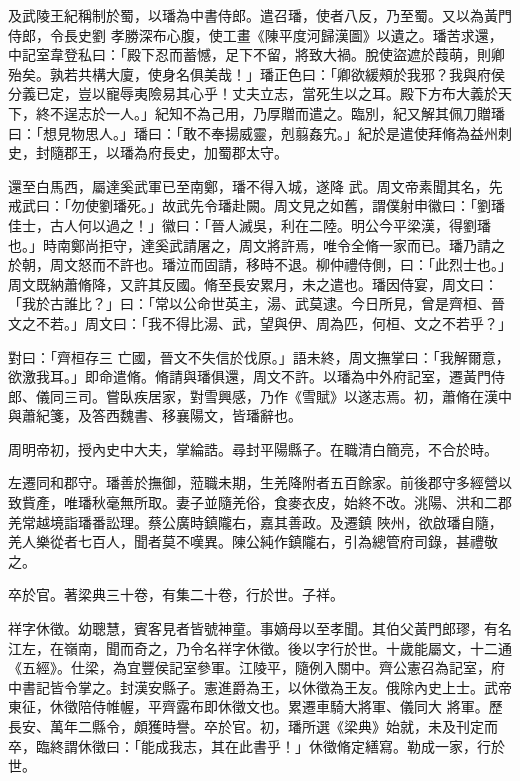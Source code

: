 \begin{pinyinscope}
 及武陵王紀稱制於蜀，以璠為中書侍郎。遣召璠，使者八反，乃至蜀。又以為黃門侍郎，令長史劉
 孝勝深布心腹，使工畫《陳平度河歸漢圖》以遺之。璠苦求還，中記室韋登私曰：「殿下忍而蓄憾，足下不留，將致大禍。脫使盜遮於葭萌，則卿殆矣。孰若共構大廈，使身名俱美哉！」璠正色曰：「卿欲緩頰於我邪？我與府侯分義已定，豈以寵辱夷險易其心乎！丈夫立志，當死生以之耳。殿下方布大義於天下，終不逞志於一人。」紀知不為己用，乃厚贈而遣之。臨別，紀又解其佩刀贈璠曰：「想見物思人。」璠曰：「敢不奉揚威靈，剋翦姦宄。」紀於是遣使拜脩為益州刺史，封隨郡王，以璠為府長史，加蜀郡太守。



 還至白馬西，屬達奚武軍已至南鄭，璠不得入城，遂降
 武。周文帝素聞其名，先戒武曰：「勿使劉璠死。」故武先令璠赴闕。周文見之如舊，謂僕射申徽曰：「劉璠佳士，古人何以過之！」徽曰：「晉人滅吳，利在二陸。明公今平梁漢，得劉璠也。」時南鄭尚拒守，達奚武請屠之，周文將許焉，唯令全脩一家而已。璠乃請之於朝，周文怒而不許也。璠泣而固請，移時不退。柳仲禮侍側，曰：「此烈士也。」周文既納蕭脩降，又許其反國。脩至長安累月，未之遣也。璠因侍宴，周文曰：「我於古誰比？」曰：「常以公命世英主，湯、武莫逮。今日所見，曾是齊桓、晉文之不若。」周文曰：「我不得比湯、武，望與伊、周為匹，何桓、文之不若乎？」



 對曰：「齊桓存三
 亡國，晉文不失信於伐原。」語未終，周文撫掌曰：「我解爾意，欲激我耳。」即命遣脩。脩請與璠俱還，周文不許。以璠為中外府記室，遷黃門侍郎、儀同三司。嘗臥疾居家，對雪興感，乃作《雪賦》以遂志焉。初，蕭脩在漢中與蕭紀箋，及答西魏書、移襄陽文，皆璠辭也。



 周明帝初，授內史中大夫，掌綸誥。尋封平陽縣子。在職清白簡亮，不合於時。



 左遷同和郡守。璠善於撫御，蒞職未期，生羌降附者五百餘家。前後郡守多經營以致貲產，唯璠秋毫無所取。妻子並隨羌俗，食麥衣皮，始終不改。洮陽、洪和二郡羌常越境詣璠番訟理。蔡公廣時鎮隴右，嘉其善政。及遷鎮
 陜州，欲啟璠自隨，羌人樂從者七百人，聞者莫不嘆異。陳公純作鎮隴右，引為總管府司錄，甚禮敬之。



 卒於官。著梁典三十卷，有集二十卷，行於世。子祥。



 祥字休徵。幼聰慧，賓客見者皆號神童。事嫡母以至孝聞。其伯父黃門郎璆，有名江左，在嶺南，聞而奇之，乃令名祥字休徵。後以字行於世。十歲能屬文，十二通《五經》。仕梁，為宜豐侯記室參軍。江陵平，隨例入關中。齊公憲召為記室，府中書記皆令掌之。封漢安縣子。憲進爵為王，以休徵為王友。俄除內史上士。武帝東征，休徵陪侍帷幄，平齊露布即休徵文也。累遷車騎大將軍、儀同大
 將軍。歷長安、萬年二縣令，頗獲時譽。卒於官。初，璠所選《梁典》始就，未及刊定而卒，臨終謂休徵曰：「能成我志，其在此書乎！」休徵脩定繕寫。勒成一家，行於世。




\end{pinyinscope}
